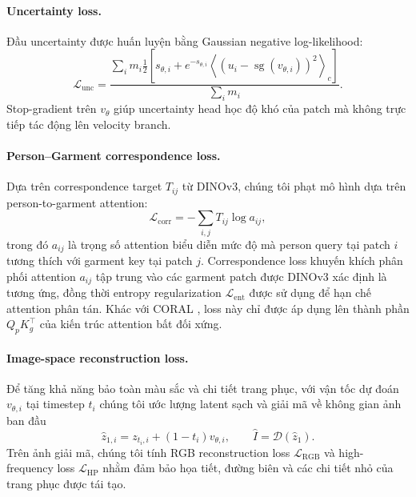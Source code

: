 \documentclass[11pt,a4paper]{article}
\newcommand{\Dec}{\mathcal{D}}
\newcommand{\Loss}{\mathcal{L}}
\begin{document}
\paragraph{Uncertainty loss.}
Đầu uncertainty được huấn luyện bằng Gaussian negative log-likelihood:
\begin{equation}
\Loss_{\mathrm{unc}}=\frac{\sum_i m_i\frac12\left[s_{\theta,i}+e^{-s_{\theta,i}}\left\langle\left(u_i-\operatorname{sg}(v_{\theta,i})\right)^2\right\rangle_c\right]}{\sum_i m_i}.
\end{equation}
Stop-gradient trên \(v_\theta\) giúp uncertainty head học độ khó của patch mà không trực tiếp tác động lên velocity branch.

\paragraph{Person--Garment correspondence loss.}
Dựa trên correspondence target \(T_{ij}\) từ DINOv3, chúng tôi phạt mô hình dựa trên person-to-garment attention:
\begin{equation}
\Loss_{\mathrm{corr}} = -\sum_{i,j}T_{ij}\log a_{ij},
\end{equation}
trong đó \(a_{ij}\) là trọng số attention biểu diễn mức độ mà person query tại patch \(i\) tương thích với garment key tại patch \(j\). Correspondence loss khuyến khích phân phối attention \(a_{ij}\) tập trung vào các garment patch được DINOv3 xác định là tương ứng, đồng thời entropy regularization \(\Loss_{\mathrm{ent}}\) được sử dụng để hạn chế attention phân tán. Khác với CORAL \cite{coral}, loss này chỉ được áp dụng lên thành phần \(Q_pK_g^\top\) của kiến trúc attention bất đối xứng.

\paragraph{Image-space reconstruction loss.}
Để tăng khả năng bảo toàn màu sắc và chi tiết trang phục, với vận tốc dự đoán \(v_{\theta,i}\) tại timestep \(t_i\) chúng tôi ước lượng latent sạch và giải mã về không gian ảnh ban đầu
\begin{equation}
\widehat z_{1,i}=z_{t_i,i}+(1-t_i)v_{\theta,i},\qquad \widehat I=\Dec(\widehat z_1).
\end{equation}
Trên ảnh giải mã, chúng tôi tính RGB reconstruction loss \(\Loss_{\mathrm{RGB}}\) và high-frequency loss \(\Loss_{\mathrm{HP}}\) nhằm đảm bảo họa tiết, đường biên và các chi tiết nhỏ của trang phục được tái tạo.
\end{document}
